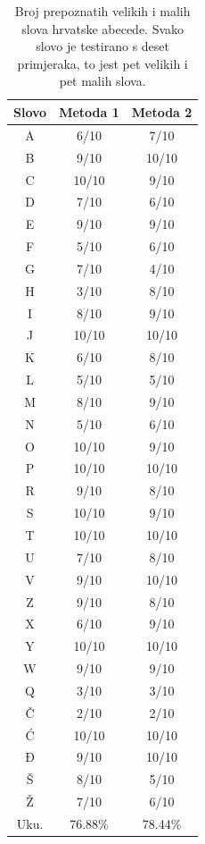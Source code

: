 \begin{table}[]
\centering
\caption{Broj prepoznatih velikih i malih slova hrvatske abecede. Svako slovo je testirano s deset primjeraka, to jest pet velikih i pet malih slova.}
\label{cro_abc}
\scalebox{0.95} {
\begin{tabular}{c|c|c}
\hline
Slovo & Metoda 1 & Metoda 2 \\ \hline
A & 6/10 & 7/10 \\ \hline
B & 9/10 & 10/10 \\ \hline
C & 10/10 & 9/10 \\ \hline
D & 7/10 & 6/10 \\ \hline
E & 9/10 & 9/10 \\ \hline
F & 5/10 & 6/10 \\ \hline
G & 7/10 & 4/10 \\ \hline
H & 3/10 & 8/10 \\ \hline
I & 8/10 & 9/10 \\ \hline
J & 10/10 & 10/10 \\ \hline
K & 6/10 & 8/10 \\ \hline
L & 5/10 & 5/10 \\ \hline
M & 8/10 & 9/10 \\ \hline
N & 5/10 & 6/10 \\ \hline
O & 10/10 & 9/10 \\ \hline
P & 10/10 & 10/10 \\ \hline
R & 9/10 & 8/10 \\ \hline
S & 10/10 & 9/10 \\ \hline
T & 10/10 & 10/10 \\ \hline
U & 7/10 & 8/10 \\ \hline
V & 9/10 & 10/10 \\ \hline
Z & 9/10 & 8/10 \\ \hline
X & 6/10 & 9/10 \\ \hline
Y & 10/10 & 10/10 \\ \hline
W & 9/10 & 9/10 \\ \hline
Q & 3/10 & 3/10 \\ \hline
Č & 2/10 & 2/10 \\ \hline
Ć & 10/10 & 10/10 \\ \hline
Đ & 9/10 & 10/10 \\ \hline
Š & 8/10 & 5/10 \\ \hline
Ž & 7/10 & 6/10 \\ \hline
Uku. & 76.88\% & 78.44\% \\ \hline
\end{tabular}
}
\end{table}


